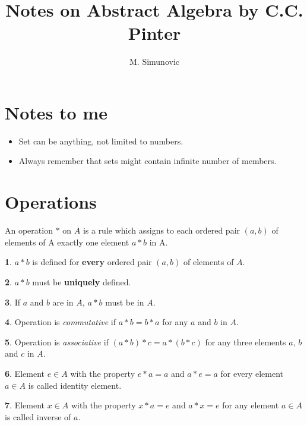 \documentclass[a4paper,12pt]{article}
\title{Notes on Abstract Algebra by C.C. Pinter}
\author{M. Simunovic}
\theoremstyle{definition}
\newtheorem{definition}{}[section]
\theoremstyle{axiom}
\theoremstyle{theorem}
\theoremstyle{lemma}
\begin{document}
\maketitle

\section{Notes to me}
\begin{itemize}
        \item Set can be anything, not limited to numbers.
        \item Always remember that sets might contain infinite number of members.
\end{itemize}
\section{Operations}
An operation $*$ on $A$ is a rule which assigns to each ordered pair $(a,b)$ of elements of A exactly one element $a * b$ in A.
\begin{definition}{}
        \textnormal{$a * b$ is defined for \textbf{every} ordered pair $(a, b)$ of elements of $A$.}
\end{definition}
\begin{definition}{}
        \textnormal{$a * b$ must be \textbf{uniquely} defined.}
\end{definition}
\begin{definition}{}
        \textnormal{If $a$ and $b$ are in $A$, $a * b$ must be in $A$.}
\end{definition}
\begin{definition}{}
        \textnormal{Operation is \textit{commutative} if $a * b = b * a$ for any $a$ and $b$ in $A$.}
\end{definition}
\begin{definition}{}
        \textnormal{Operation is \textit{associative} if $(a * b) * c = a * (b * c)$ for any three elements $a$, $b$ and $c$ in $A$.}
\end{definition}
\begin{definition}{}
        Element $e \in A$ with the property $e * a = a$ and $a * e = a$ for every element $a \in A$  is called identity element.
\end{definition}
\begin{definition}{}
        \textnormal{Element $x \in A$ with the property $x * a = e$ and $a * x = e$ for any element $a \in A$ is called inverse of $a$.}
\end{definition}
\end{document}
